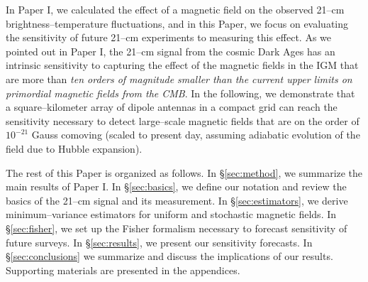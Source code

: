 In Paper I, we calculated the effect of a magnetic field on the observed 21--cm brightness--temperature fluctuations, and in this Paper, we focus on evaluating the sensitivity of future 21--cm experiments to measuring this effect. As we pointed out in Paper I, the 21--cm signal from the cosmic Dark Ages has an intrinsic sensitivity to capturing the effect of the magnetic fields in the IGM that are more than \textit{ten orders of magnitude smaller than the current upper limits on primordial magnetic fields from the CMB}. In the following, we demonstrate that a square--kilometer array of dipole antennas in a compact grid can reach the sensitivity necessary to detect large--scale magnetic fields that are on the order of $10^{-21}$ Gauss comoving (scaled to present day, assuming adiabatic evolution of the field due to Hubble expansion). 

The rest of this Paper is organized as follows. In \S\ref{sec:method}, we summarize the main results of Paper I. In \S\ref{sec:basics}, we define our notation and review the basics of the 21--cm signal and its measurement. In \S\ref{sec:estimators}, we derive minimum--variance estimators for uniform and stochastic magnetic fields. In \S\ref{sec:fisher}, we set up the Fisher formalism necessary to forecast sensitivity of future surveys. In \S\ref{sec:results}, we present our sensitivity forecasts. In \S\ref{sec:conclusions} we summarize and discuss the implications of our results. Supporting materials are presented in the appendices.